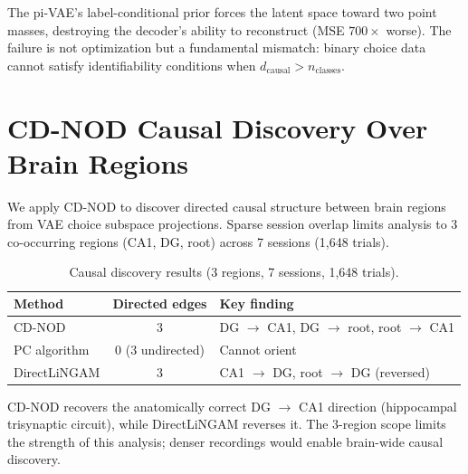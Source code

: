 \documentclass{article}
\begin{document}
The pi-VAE's label-conditional prior forces the latent space toward two point masses, destroying the decoder's ability to reconstruct (MSE $700\times$ worse). The failure is not optimization but a fundamental mismatch: binary choice data cannot satisfy identifiability conditions when $d_{\text{causal}} > n_{\text{classes}}$.


\section{CD-NOD Causal Discovery Over Brain Regions}
\label{app:cdnod}

We apply CD-NOD \citep{huang2020causal} to discover directed causal structure between brain regions from VAE choice subspace projections. Sparse session overlap limits analysis to 3 co-occurring regions (CA1, DG, root) across 7 sessions (1,648 trials).

\begin{table}[h]
\centering
\caption{Causal discovery results (3 regions, 7 sessions, 1,648 trials).}
\label{tab:cdnod}
\small
\begin{tabular}{lcl}
\toprule
\textbf{Method} & \textbf{Directed edges} & \textbf{Key finding} \\
\midrule
CD-NOD         & 3 & DG $\to$ CA1, DG $\to$ root, root $\to$ CA1 \\
PC algorithm   & 0 (3 undirected) & Cannot orient \\
DirectLiNGAM   & 3 & CA1 $\to$ DG, root $\to$ DG (reversed) \\
\bottomrule
\end{tabular}
\end{table}

CD-NOD recovers the anatomically correct DG $\to$ CA1 direction (hippocampal trisynaptic circuit), while DirectLiNGAM reverses it. The 3-region scope limits the strength of this analysis; denser recordings would enable brain-wide causal discovery.
\end{document}
